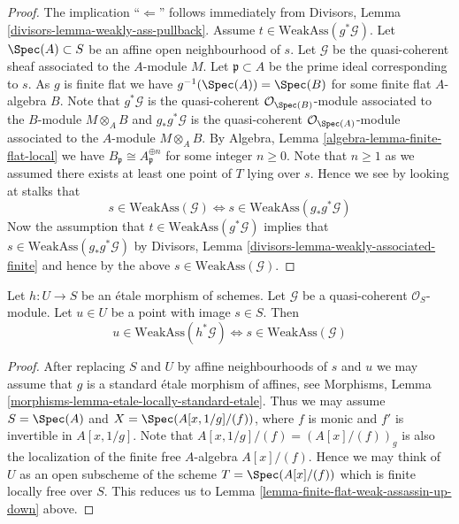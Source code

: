 \begin{proof}
The implication ``$\Leftarrow$'' follows immediately from
Divisors, Lemma \ref{divisors-lemma-weakly-ass-pullback}.
Assume $t \in \text{WeakAss}(g^*\mathcal{G})$.
Let $\Spec(A) \subset S$ be an affine open neighbourhood of $s$.
Let $\mathcal{G}$ be the quasi-coherent sheaf associated to the $A$-module $M$.
Let $\mathfrak p \subset A$ be the prime ideal corresponding to $s$.
As $g$ is finite flat we have $g^{-1}(\Spec(A)) = \Spec(B)$
for some finite flat $A$-algebra $B$. Note that
$g^*\mathcal{G}$ is the quasi-coherent $\mathcal{O}_{\Spec(B)}$-module
associated to the $B$-module $M \otimes_A B$ and $g_*g^*\mathcal{G}$ is the
quasi-coherent $\mathcal{O}_{\Spec(A)}$-module associated to the
$A$-module $M \otimes_A B$. By
Algebra, Lemma \ref{algebra-lemma-finite-flat-local}
we have $B_{\mathfrak p} \cong A_{\mathfrak p}^{\oplus n}$
for some integer $n \geq 0$. Note that $n \geq 1$ as we assumed there
exists at least one point of $T$ lying over $s$. Hence we see by
looking at stalks that
$$
s \in \text{WeakAss}(\mathcal{G})
\Leftrightarrow
s \in \text{WeakAss}(g_*g^*\mathcal{G})
$$
Now the assumption that $t \in \text{WeakAss}(g^*\mathcal{G})$
implies that $s \in \text{WeakAss}(g_*g^*\mathcal{G})$ by
Divisors, Lemma \ref{divisors-lemma-weakly-associated-finite}
and hence by the above $s \in  \text{WeakAss}(\mathcal{G})$.
\end{proof}

\begin{lemma}
\label{lemma-etale-weak-assassin-up-down}
Let $h : U \to S$ be an \'etale morphism of schemes.
Let $\mathcal{G}$ be a quasi-coherent $\mathcal{O}_S$-module.
Let $u \in U$ be a point with image $s \in S$. Then
$$
u \in \text{WeakAss}(h^*\mathcal{G})
\Leftrightarrow
s \in \text{WeakAss}(\mathcal{G})
$$
\end{lemma}

\begin{proof}
After replacing $S$ and $U$ by affine neighbourhoods of $s$ and $u$
we may assume that $g$ is a standard \'etale morphism of affines, see
Morphisms, Lemma \ref{morphisms-lemma-etale-locally-standard-etale}.
Thus we may assume $S = \Spec(A)$ and
$X = \Spec(A[x, 1/g]/(f))$, where $f$ is monic and $f'$
is invertible in $A[x, 1/g]$.
Note that $A[x, 1/g]/(f) = (A[x]/(f))_g$ is also the localization
of the finite free $A$-algebra $A[x]/(f)$. Hence we may think of
$U$ as an open subscheme of the scheme $T = \Spec(A[x]/(f))$
which is finite locally free over $S$. This reduces us to
Lemma \ref{lemma-finite-flat-weak-assassin-up-down}
above.
\end{proof}

